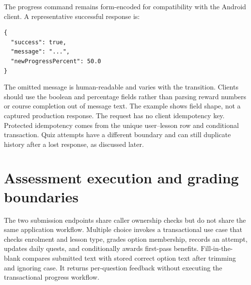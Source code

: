 \documentclass[12pt,a4paper,oneside]{report}
\begin{document}
The progress command remains form-encoded for compatibility with the Android client.
A representative successful response is:
\begin{lstlisting}[language={},caption={Lesson-completion response contract}]
{
  "success": true,
  "message": "...",
  "newProgressPercent": 50.0
}
\end{lstlisting}
The omitted message is human-readable and varies with the transition. Clients
should use the boolean and percentage fields rather than parsing reward numbers or
course completion out of message text. The example shows field shape, not a captured
production response.
The request has no client idempotency key. Protected idempotency comes from the unique
user--lesson row and conditional transaction. Quiz attempts have a different boundary
and can still duplicate history after a lost response, as discussed later.

\section{Assessment execution and grading boundaries}
\label{sec:assessment-execution}
The two submission endpoints share caller ownership checks but do not share the
same application workflow. Multiple choice invokes a transactional use case that
checks enrolment and lesson type, grades option membership, records an attempt,
updates daily quests, and conditionally awards first-pass benefits. Fill-in-the-blank
compares submitted text with stored correct option text after trimming and ignoring
case. It returns per-question feedback without executing the transactional progress
workflow.

\quizworkflowdiagram
\end{document}
